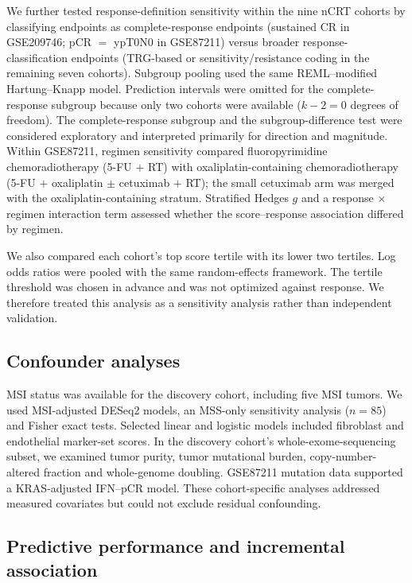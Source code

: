 \documentclass[11pt,a4paper]{article}
\begin{document}
We further tested response-definition sensitivity within the nine nCRT cohorts by classifying endpoints as complete-response endpoints (sustained CR in GSE209746; pCR $=$ ypT0N0 in GSE87211) versus broader response-classification endpoints (TRG-based or sensitivity/resistance coding in the remaining seven cohorts). Subgroup pooling used the same REML--modified Hartung--Knapp model. Prediction intervals were omitted for the complete-response subgroup because only two cohorts were available ($k-2=0$ degrees of freedom). The complete-response subgroup and the subgroup-difference test were considered exploratory and interpreted primarily for direction and magnitude. Within GSE87211, regimen sensitivity compared fluoropyrimidine chemoradiotherapy (5-FU $+$ RT) with oxaliplatin-containing chemoradiotherapy (5-FU $+$ oxaliplatin $\pm$ cetuximab $+$ RT); the small cetuximab arm was merged with the oxaliplatin-containing stratum. Stratified Hedges $g$ and a response $\times$ regimen interaction term assessed whether the score--response association differed by regimen.

We also compared each cohort's top score tertile with its lower two tertiles. Log odds ratios were pooled with the same random-effects framework. The tertile threshold was chosen in advance and was not optimized against response. We therefore treated this analysis as a sensitivity analysis rather than independent validation.

\subsection{Confounder analyses}

MSI status was available for the discovery cohort, including five MSI tumors. We used MSI-adjusted DESeq2 models, an MSS-only sensitivity analysis ($n=85$) and Fisher exact tests. Selected linear and logistic models included fibroblast and endothelial marker-set scores. In the discovery cohort's whole-exome-sequencing subset, we examined tumor purity, tumor mutational burden, copy-number-altered fraction and whole-genome doubling. GSE87211 mutation data supported a KRAS-adjusted IFN--pCR model. These cohort-specific analyses addressed measured covariates but could not exclude residual confounding.

\subsection{Predictive performance and incremental association}
\end{document}
